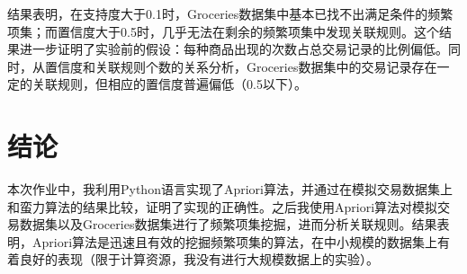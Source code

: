 \documentclass[12pt,a4paper]{article}
\theoremstyle{definition}
\begin{document}
结果表明，在支持度大于0.1时，Groceries数据集中基本已找不出满足条件的频繁项集；而置信度大于0.5时，几乎无法在剩余的频繁项集中发现关联规则。这个结果进一步证明了实验前的假设：每种商品出现的次数占总交易记录的比例偏低。同时，从置信度和关联规则个数的关系分析，Groceries数据集中的交易记录存在一定的关联规则，但相应的置信度普遍偏低（0.5以下）。

\section{结论}

本次作业中，我利用Python语言实现了Apriori算法，并通过在模拟交易数据集上和蛮力算法的结果比较，证明了实现的正确性。之后我使用Apriori算法对模拟交易数据集以及Groceries数据集进行了频繁项集挖掘，进而分析关联规则。结果表明，Apriori算法是迅速且有效的挖掘频繁项集的算法，在中小规模的数据集上有着良好的表现（限于计算资源，我没有进行大规模数据上的实验）。
\end{document}

